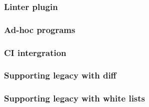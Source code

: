 \begin{frame}
\frametitle{Linter plugin}
\end{frame}

\begin{frame}
\frametitle{Ad-hoc programs}
\end{frame}

\begin{frame}
\frametitle{CI intergration}
\end{frame}

\begin{frame}
\frametitle{Supporting legacy with diff}
\end{frame}

\begin{frame}
\frametitle{Supporting legacy with white lists}
\end{frame}


